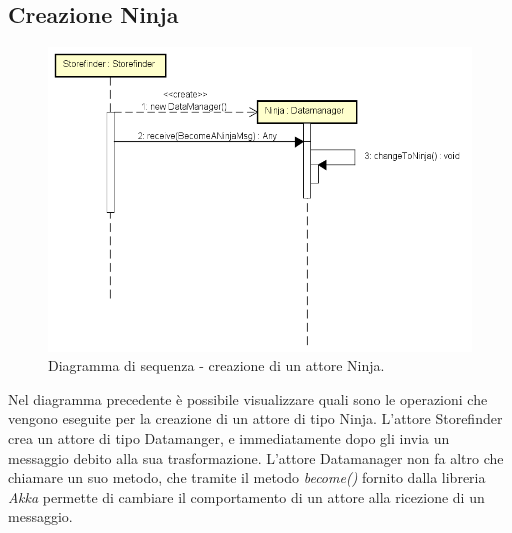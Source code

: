 \documentclass[a4paper]{article}
\begin{document}
        \subsection{Creazione Ninja}
            \begin{figure} [H]
				\centering
				\includegraphics[width=\textwidth]{ST/seq/CreazioneNinja.png}
				\caption{Diagramma di sequenza - creazione di un attore Ninja.}
			\end{figure}
            Nel diagramma precedente è possibile visualizzare quali sono le operazioni che vengono eseguite per la creazione di un attore di tipo Ninja. 
            L'attore Storefinder crea un attore di tipo Datamanger, e immediatamente dopo gli invia un messaggio debito alla sua trasformazione. L'attore 
            Datamanager non fa altro che chiamare un suo metodo, che tramite il metodo \textit{become()} fornito dalla libreria \textit{Akka} permette di 
            cambiare il comportamento di un attore alla ricezione di un messaggio.
         
\end{document}
